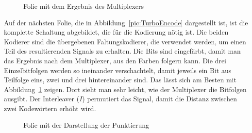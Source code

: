 \begin{figure}[th]
\centering
{}
\caption{Folie mit dem Ergebnis des Multiplexers}
\label{pic:TurboEncodeMultiplexer}
\end{figure}  

Auf der nächsten Folie, die in Abbildung~\ref{pic:TurboEncode} dargestellt ist, ist die komplette Schaltung abgebildet, die für die Kodierung nötig ist. Die beiden Kodierer sind die übergebenen Faltungskodierer, die verwendet werden, um einen Teil des resultierenden Signals zu erhalten. Die Bits sind eingefärbt, damit man das Ergebnis nach dem Multiplexer, aus den Farben folgern kann. Die drei Einzelbitfolgen werden so ineinander verschachtelt, damit jeweils ein Bit aus Teilfolge eins, zwei und drei hintereinander sind. Das lässt sich am Besten mit Abbildung~\ref{pic:TurboEncodeMultiplexer} zeigen. Dort sieht man sehr leicht, wie der Multiplexer die Bitfolgen ausgibt. Der Interleaver ($I$) permutiert das Signal, damit die Distanz zwischen zwei Kodewörtern erhöht wird.

\begin{figure}[th]
\centering
{}
\caption{Folie mit der Darstellung der Punktierung}
\label{pic:TurboEncodePuncturing}
\end{figure}  


